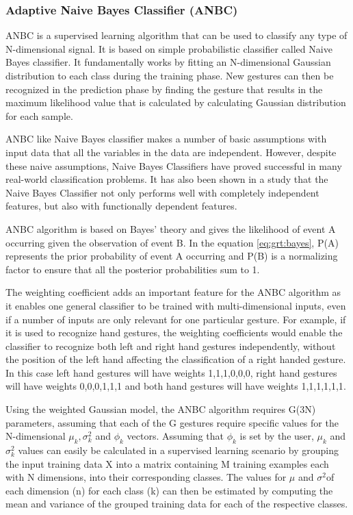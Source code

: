 \subsubsection{Adaptive Naive Bayes Classifier (ANBC)} ANBC is a supervised learning algorithm that can be used to classify any type of N-dimensional signal. It is based on simple probabilistic classifier called Naive Bayes classifier. It fundamentally works by fitting an N-dimensional Gaussian distribution to each class during the training phase. New gestures can then be recognized in the prediction phase by finding the gesture that results in the maximum likelihood value that is calculated by calculating Gaussian distribution for each sample. 

ANBC like Naive Bayes classifier makes a number of basic assumptions with input data that all the variables in the data are independent. However, despite these naive assumptions, Naive Bayes Classifiers have proved successful in many real-world classification problems. It has also been shown in a study that the Naive Bayes Classifier not only performs well with completely independent features, but also with functionally dependent features.

ANBC algorithm is based on Bayes' theory and gives the likelihood of event A occurring given the observation of event B. In the equation \ref{eq:grt:bayes}, P(A) represents the prior probability of event A occurring and P(B) is a normalizing factor to ensure that all the posterior probabilities sum to 1.



The weighting coefficient adds an important feature for the ANBC algorithm as it enables one general classifier to be trained with multi-dimensional inputs, even if a number of inputs are only relevant for one particular gesture. For example, if it is used to recognize hand gestures, the weighting coefficients would enable the classifier to recognize both left and right hand gestures independently, without the position of the left hand affecting the classification of a right handed gesture. In this case left hand gestures will have weights {1,1,1,0,0,0}, right hand gestures will have weights {0,0,0,1,1,1} and both hand gestures will have weights {1,1,1,1,1,1}.

Using the weighted Gaussian model, the ANBC algorithm requires G(3N) parameters, assuming that each of the G gestures require specific values for the N-dimensional $ \mu_{k} , \sigma_{k}^{2} $ and $ \phi_{k} $ vectors. Assuming that $ \phi_{k} $ is set by the user, $ \mu_{k} $ and $\sigma_{k}^{2} $ values can easily be calculated in a supervised learning scenario by grouping the input training data X into a matrix containing M training examples each with N dimensions, into their corresponding classes. The values for $ \mu$ and $\sigma^{2} $of each dimension (n) for each class (k) can then be estimated by computing the mean and variance of the grouped training data for each of the respective classes.

